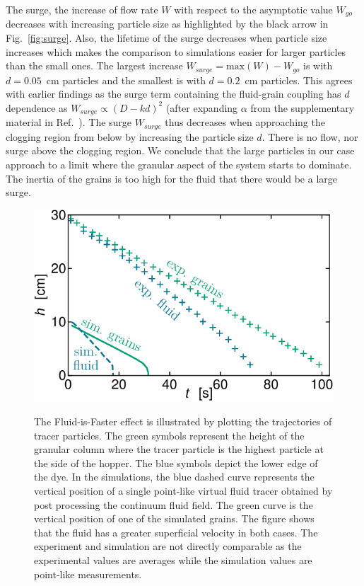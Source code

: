 \documentclass[twoside,twocolumn,9pt]{article}
\begin{document}
The surge, the increase of flow rate $W$ with respect to the asymptotic value 
$W_{go}$ decreases with increasing particle size as highlighted by the black arrow in Fig.~\ref{fig:surge}. 
Also, the lifetime of the surge decreases when particle size increases which makes the comparison to simulations easier for larger particles than the small ones.
The largest increase $W_{surge} = \mathrm{max}(W) - W_{go}$ is with 
$d=0.05$~cm particles and the smallest is with $d=0.2$~cm particles. 
This agrees with earlier findings as the surge term 
containing the fluid-grain coupling has $d$ dependence as $W_{surge}\propto(D-kd)^2$ 
(after expanding $\alpha$ from the supplementary material in 
Ref.~\cite{koivistoSubmitted}). 
The surge $W_{surge}$ thus decreases when approaching the clogging region 
from below by increasing the particle size $d$. 
There is no flow, nor surge above the clogging region. 
We conclude that the large particles in our case approach to a limit where 
the granular aspect of the system starts to dominate. 
The inertia of the grains is too high for the fluid that there would be a 
large surge.
% 
\begin{figure}[!t] %
\includegraphics[width=\columnwidth]{fig4_fluid_is_faster.pdf}\\
\caption{The Fluid-is-Faster effect is illustrated by plotting the trajectories of tracer particles.
The green symbols represent the height of the granular column where the tracer particle is the highest particle at the side of the hopper. 
The blue symbols depict the lower edge of the dye.
In the simulations, the blue dashed curve represents the vertical position of a single point-like virtual fluid tracer obtained by post processing the continuum fluid field.
The green curve is the vertical position of one of the simulated grains.
The figure shows that the fluid has a greater superficial velocity in both cases.
The experiment and simulation are not directly comparable as the experimental values are averages while the simulation values are point-like measurements.
\label{fig:fluid_is_faster}}
\end{figure}
\end{document}
